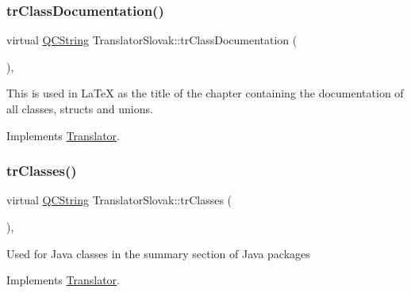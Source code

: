 \mbox{\label{class_translator_slovak_a3b65897ba54e53cf0671d37a9975f4b3}} 
\subsubsection{\texorpdfstring{trClassDocumentation()}{trClassDocumentation()}}
{\footnotesize\ttfamily virtual \mbox{\hyperlink{class_q_c_string}{Q\+C\+String}} Translator\+Slovak\+::tr\+Class\+Documentation (\begin{DoxyParamCaption}{ }\end{DoxyParamCaption})\hspace{0.3cm}{\ttfamily [inline]}, {\ttfamily [virtual]}}

This is used in La\+TeX as the title of the chapter containing the documentation of all classes, structs and unions. 

Implements \mbox{\hyperlink{class_translator}{Translator}}.

\mbox{\label{class_translator_slovak_a512d35544146a757532fcefefc204e14}} 
\subsubsection{\texorpdfstring{trClasses()}{trClasses()}}
{\footnotesize\ttfamily virtual \mbox{\hyperlink{class_q_c_string}{Q\+C\+String}} Translator\+Slovak\+::tr\+Classes (\begin{DoxyParamCaption}{ }\end{DoxyParamCaption})\hspace{0.3cm}{\ttfamily [inline]}, {\ttfamily [virtual]}}

Used for Java classes in the summary section of Java packages 

Implements \mbox{\hyperlink{class_translator}{Translator}}.

\mbox{\label{class_translator_slovak_ad80fc7364cdc1a38888029256fc4f530}} 
